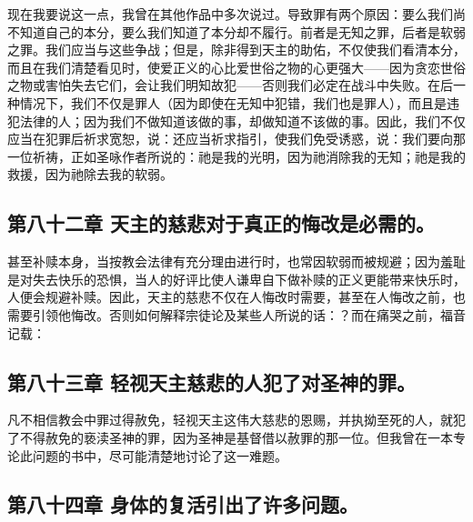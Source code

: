 现在我要说这一点，我曾在其他作品中多次说过。导致罪有两个原因：要么我们尚不知道自己的本分，要么我们知道了本分却不履行。前者是无知之罪，后者是软弱之罪。我们应当与这些争战；但是，除非得到天主的助佑，不仅使我们看清本分，而且在我们清楚看见时，使爱正义的心比爱世俗之物的心更强大——因为贪恋世俗之物或害怕失去它们，会让我们明知故犯——否则我们必定在战斗中失败。在后一种情况下，我们不仅是罪人（因为即使在无知中犯错，我们也是罪人），而且是违犯法律的人；因为我们不做知道该做的事，却做知道不该做的事。因此，我们不仅应当在犯罪后祈求宽恕，说：还应当祈求指引，使我们免受诱惑，说：我们要向那一位祈祷，正如圣咏作者所说的：祂是我的光明，因为祂消除我的无知；祂是我的救援，因为祂除去我的软弱。\par


\subsection{第八十二章 天主的慈悲对于真正的悔改是必需的。}

甚至补赎本身，当按教会法律有充分理由进行时，也常因软弱而被规避；因为羞耻是对失去快乐的恐惧，当人的好评比使人谦卑自下做补赎的正义更能带来快乐时，人便会规避补赎。因此，天主的慈悲不仅在人悔改时需要，甚至在人悔改之前，也需要引领他悔改。否则如何解释宗徒论及某些人所说的话：？而在痛哭之前，福音记载：\par


\subsection{第八十三章 轻视天主慈悲的人犯了对圣神的罪。}

凡不相信教会中罪过得赦免，轻视天主这伟大慈悲的恩赐，并执拗至死的人，就犯了不得赦免的亵渎圣神的罪，因为圣神是基督借以赦罪的那一位。但我曾在一本专论此问题的书中，尽可能清楚地讨论了这一难题。\par


\subsection{第八十四章 身体的复活引出了许多问题。}

